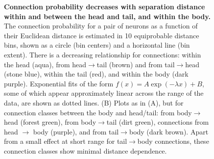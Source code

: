 \documentclass[10pt,letterpaper]{article}
\begin{document}
\begin{figure}[h]
  \centering
  \caption{
\textbf{Connection probability decreases with separation distance within and between the head and tail, and within the body.}
The connection probability for a pair of neurons as a function of their Euclidean distance is estimated in 10 equiprobable distance bins, shown as a circle (bin centers) and a horizontal line (bin extent).
There is a decreasing relationship for connections: within the head (aqua), from head$\rightarrow$tail (brown) and from tail$\rightarrow$head (stone blue), within the tail (red), and within the body (dark purple).
Exponential fits of the form $f(x) = A\exp(-\lambda x) + B$, some of which appear approximately linear across the range of the data, are shown as dotted lines.
(B)
Plots as in (A), but for connection classes between the body and head/tail: from body$\rightarrow$head (forest green), from body$\rightarrow$tail (dirt green), connections from head $\rightarrow$ body (purple), and from tail$\rightarrow$body (dark brown).
Apart from a small effect at short range for tail$\rightarrow$body connections, these connection classes show minimal distance dependence.
  }
  \label{fig:Fig3}
\end{figure}

\end{document}
